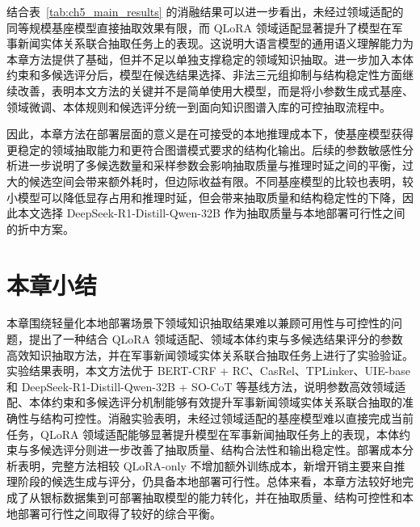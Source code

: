 结合表~\ref{tab:ch5_main_results} 的消融结果可以进一步看出，未经过领域适配的同等规模基座模型直接抽取效果有限，而 QLoRA 领域适配显著提升了模型在军事新闻实体关系联合抽取任务上的表现。这说明大语言模型的通用语义理解能力为本章方法提供了基础，但并不足以单独支撑稳定的领域知识抽取。进一步加入本体约束和多候选评分后，模型在候选结果选择、非法三元组抑制与结构稳定性方面继续改善，表明本文方法的关键并不是简单使用大模型，而是将小参数生成式基座、领域微调、本体规则和候选评分统一到面向知识图谱入库的可控抽取流程中。

因此，本章方法在部署层面的意义是在可接受的本地推理成本下，使基座模型获得更稳定的领域抽取能力和更符合图谱模式要求的结构化输出。后续的参数敏感性分析进一步说明了多候选数量和采样参数会影响抽取质量与推理时延之间的平衡，过大的候选空间会带来额外耗时，但边际收益有限。不同基座模型的比较也表明，较小模型可以降低显存占用和推理时延，但会带来抽取质量和结构稳定性的下降，因此本文选择 DeepSeek-R1-Distill-Qwen-32B 作为抽取质量与本地部署可行性之间的折中方案。

\FloatBarrier

\section{本章小结}

本章围绕轻量化本地部署场景下领域知识抽取结果难以兼顾可用性与可控性的问题，提出了一种结合 QLoRA 领域适配、领域本体约束与多候选结果评分的参数高效知识抽取方法，并在军事新闻领域实体关系联合抽取任务上进行了实验验证。实验结果表明，本文方法优于 BERT-CRF + RC、CasRel、TPLinker、UIE-base 和 DeepSeek-R1-Distill-Qwen-32B + SO-CoT 等基线方法，说明参数高效领域适配、本体约束和多候选评分机制能够有效提升军事新闻领域实体关系联合抽取的准确性与结构可控性。消融实验表明，未经过领域适配的基座模型难以直接完成当前任务，QLoRA 领域适配能够显著提升模型在军事新闻抽取任务上的表现，本体约束与多候选评分则进一步改善了抽取质量、结构合法性和输出稳定性。部署成本分析表明，完整方法相较 QLoRA-only 不增加额外训练成本，新增开销主要来自推理阶段的候选生成与评分，仍具备本地部署可行性。总体来看，本章方法较好地完成了从银标数据集到可部署抽取模型的能力转化，并在抽取质量、结构可控性和本地部署可行性之间取得了较好的综合平衡。
